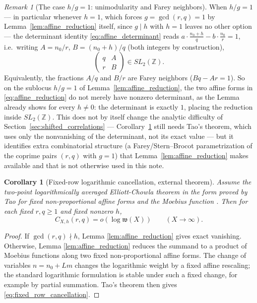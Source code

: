 \documentclass[11pt]{amsart}
\numberwithin{equation}{section}
\theoremstyle{plain}
\newtheorem{corollary}[theorem]{Corollary}
\theoremstyle{definition}
\theoremstyle{remark}
\newtheorem{remark}[theorem]{Remark}
\begin{document}
\begin{remark}[The case \(h/g=1\): unimodularity and Farey neighbors]
\label{rem:sl2z_farey}
When \(h/g=1\) — in particular whenever \(h=1\), which forces \(g=\gcd(r,q)=1\) by Lemma~\ref{lem:affine_reduction} itself, since \(g\mid h\) with \(h=1\) leaves no other option — the determinant identity \eqref{eq:affine_determinant} reads \(a\cdot\frac{n_0+h}q-b\cdot\frac{n_0}r=1\), i.e.\ writing \(A=n_0/r\), \(B=(n_0+h)/q\) (both integers by construction),
\begin{equation}
\begin{pmatrix}q&A\\r&B\end{pmatrix}\in SL_2(\mathbb Z).
\label{eq:sl2z_matrix}
\end{equation}
Equivalently, the fractions \(A/q\) and \(B/r\) are Farey neighbors (\(Bq-Ar=1\)).  So on the sublocus \(h/g=1\) of Lemma~\ref{lem:affine_reduction}, the two affine forms in \eqref{eq:affine_reduction} do not merely have nonzero determinant, as the Lemma already shows for every \(h\ne0\): the determinant is exactly \(1\), placing the reduction inside \(SL_2(\mathbb Z)\).  This does not by itself change the analytic difficulty of Section~\ref{sec:shifted_correlations} — Corollary~\ref{cor:fixed_row_tao} still needs Tao's theorem, which uses only the nonvanishing of the determinant, not its exact value — but it identifies extra combinatorial structure (a Farey/Stern--Brocot parametrization of the coprime pairs \((r,q)\) with \(g=1\)) that Lemma~\ref{lem:affine_reduction} makes available and that is not otherwise used in this note.
\end{remark}

\begin{corollary}[Fixed-row logarithmic cancellation, external theorem]
\label{cor:fixed_row_tao}
Assume the two-point logarithmically averaged Elliott-Chowla theorem in the form proved by Tao for fixed non-proportional affine forms and the Moebius function \cite{Tao2016}.  Then for each fixed \(r,q\ge1\) and fixed nonzero \(h\),
\begin{equation}
C_{X,h}(r,q)=o(\log \mathfrak w(X))
\qquad (X\to\infty).
\label{eq:fixed_row_cancellation}
\end{equation}
\end{corollary}

\begin{proof}
If \(\gcd(r,q)\nmid h\), Lemma \ref{lem:affine_reduction} gives exact vanishing.  Otherwise, Lemma \ref{lem:affine_reduction} reduces the summand to a product of Moebius functions along two fixed non-proportional affine forms.  The change of variables \(n=n_0+Lm\) changes the logarithmic weight by a fixed affine rescaling; the standard logarithmic formulation is stable under such a fixed change, for example by partial summation.  Tao's theorem then gives \eqref{eq:fixed_row_cancellation}.
\end{proof}
\end{document}
